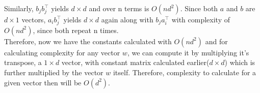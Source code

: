 \documentclass[12pt]{article}
\begin{document}
\begin{enumerate}[label=(\alph*)]
Similarly, $b_j b_j^\top$ yields $d \times d$ and over n terms is $O(nd^2)$. Since both $a$ and $b$ are $d \times 1$ vectors, $a_i b_j^\top $ yields $d \times d$ again along with $b_j a_i^\top$ with complexity of $O(nd^2)$, since both repeat n times.  \\
Therefore, now we have the constants calculated with $O(nd^2)$ and for calculating complexity for any vector $w$, we can compute it by multiplying it's transpose, a $1 \times d$ vector, with constant matrix calculated earlier($d \times d$) which is further multiplied by the vector $w$ itself. Therefore, complexity to calculate for a given vector then will be $O(d^2)$.
\end{enumerate}
\end{document}
